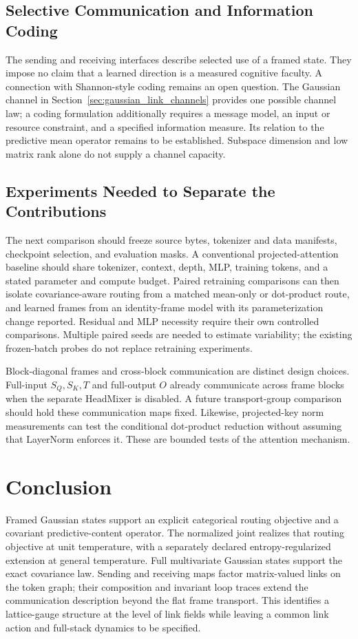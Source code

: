 \documentclass[twoside,11pt]{article}
\begin{document}
\subsection{Selective Communication and Information Coding}
The sending and receiving interfaces describe selected use of a framed state. They impose no claim that a learned direction is a measured cognitive faculty. A connection with Shannon-style coding remains an open question. The Gaussian channel in Section~\ref{sec:gaussian_link_channels} provides one possible channel law; a coding formulation additionally requires a message model, an input or resource constraint, and a specified information measure. Its relation to the predictive mean operator remains to be established. Subspace dimension and low matrix rank alone do not supply a channel capacity.

\subsection{Experiments Needed to Separate the Contributions}

The next comparison should freeze source bytes, tokenizer and data manifests, checkpoint selection, and evaluation masks. A conventional projected-attention baseline should share tokenizer, context, depth, MLP, training tokens, and a stated parameter and compute budget. Paired retraining comparisons can then isolate covariance-aware routing from a matched mean-only or dot-product route, and learned frames from an identity-frame model with its parameterization change reported. Residual and MLP necessity require their own controlled comparisons. Multiple paired seeds are needed to estimate variability; the existing frozen-batch probes do not replace retraining experiments.

Block-diagonal frames and cross-block communication are distinct design choices. Full-input $S_Q,S_K,T$ and full-output $O$ already communicate across frame blocks when the separate HeadMixer is disabled. A future transport-group comparison should hold these communication maps fixed. Likewise, projected-key norm measurements can test the conditional dot-product reduction without assuming that LayerNorm enforces it. These are bounded tests of the attention mechanism.

\section{Conclusion}

Framed Gaussian states support an explicit categorical routing objective and a covariant predictive-content operator. The normalized joint realizes that routing objective at unit temperature, with a separately declared entropy-regularized extension at general temperature. Full multivariate Gaussian states support the exact covariance law. Sending and receiving maps factor matrix-valued links on the token graph; their composition and invariant loop traces extend the communication description beyond the flat frame transport. This identifies a lattice-gauge structure at the level of link fields while leaving a common link action and full-stack dynamics to be specified.
\end{document}
